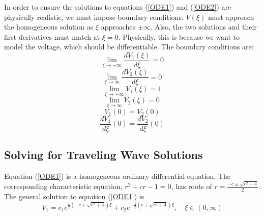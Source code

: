 \documentclass[12pt]{article}
\begin{document}
In order to ensure the solutions to equations (\ref{ODE1}) and (\ref{ODE2}) are physically realistic, we must impose boundary conditions. $V(\xi)$ must approach the homogeneous solution as $\xi$ approaches $\pm \infty$. Also, the two solutions and their first derivatives must match at $\xi=0$. Physically, this is because we want to model the voltage, which should be differentiable. The boundary conditions are:\\
$$\lim_{\xi\to-\infty} \frac{d V_1(\xi)}{d \xi}=0$$
$$\lim_{\xi\to\infty} \frac{d V_2(\xi)}{d \xi}=0$$
$$\lim_{\xi\to-\infty} V_1(\xi)=1$$
$$\lim_{\xi\to\infty} V_2(\xi)=0$$
$$V_1(0)=V_2(0)$$
$$\frac{d V_1}{d \xi}(0)=\frac{d V_2}{d \xi}(0)$$


\subsection{Solving for Traveling Wave Solutions}

Equation (\ref{ODE1}) is a homogeneous ordinary differential equation. The corresponding characteristic equation, $r^2+cr-1=0$, has roots of  $r=\frac{-c \pm \sqrt{c^2+4}}{2}$. The general solution to equation (\ref{ODE1}) is 
\begin{equation}
\label{ODE1 general solution}
V_{1}=c_1 e^{\frac{1}{2}(-c+\sqrt{c^2+4})\xi}+c_2e^{-\frac{1}{2}(c+\sqrt{c^2+4})\xi}, \quad \xi \in (0,\infty)
\end{equation}
\end{document}
